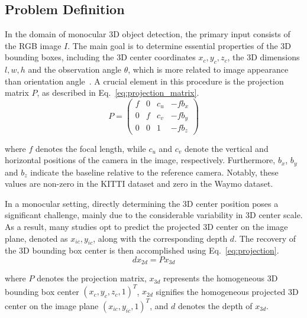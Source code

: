 \documentclass[journal]{IEEEtran}
\begin{document}
	\subsection{Problem Definition}
	In the domain of monocular 3D object detection, the primary input consists of the RGB image $I$. The main goal is to determine essential properties of the 3D bounding boxes, including the 3D center coordinates $x_c, y_c, z_c$, the 3D dimensions $l, w, h$ and the observation angle $\theta$, which is more related to image appearance than orientation angle~\cite{geometry3d}. A crucial element in this procedure is the projection matrix $P$, as described in Eq.~\eqref{eq:projection_matrix}.
	\begin{equation}
		P=\begin{pmatrix}f&0&c_u&-fb_x\\0&f&c_v&-fb_y\\0&0&1&-fb_z\end{pmatrix}
		\label{eq:projection_matrix}
	\end{equation}

	where $f$ denotes the focal length, while $c_u$ and $c_v$ denote the vertical and horizontal positions of the camera in the image, respectively. Furthermore, $b_x$, $b_y$ and $b_z$ indicate the baseline relative to the reference camera. Notably, these values are non-zero in the KITTI dataset and zero in the Waymo dataset.
	
	In a monocular setting, directly determining the 3D center position poses a significant challenge, mainly due to the considerable variability in 3D center scale. As a result, many studies opt to predict the projected 3D center on the image plane, denoted as $x_{ic}, y_{ic}$, along with the corresponding depth $d$. The recovery of the 3D bounding box center is then accomplished using Eq.~\eqref{eq:projection}.
	\begin{equation}
		dx_{2d} = Px_{3d}
		\label{eq:projection}
	\end{equation}

	where $P$ denotes the projection matrix, $x_{3d}$ represents the homogeneous 3D bounding box center $(x_c, y_c, z_c, 1)^T$, $x_{2d}$ signifies the homogeneous projected 3D center on the image plane $(x_{ic}, y_{ic}, 1)^T$, and $d$ denotes the depth of $x_{3d}$.
	
\end{document}
